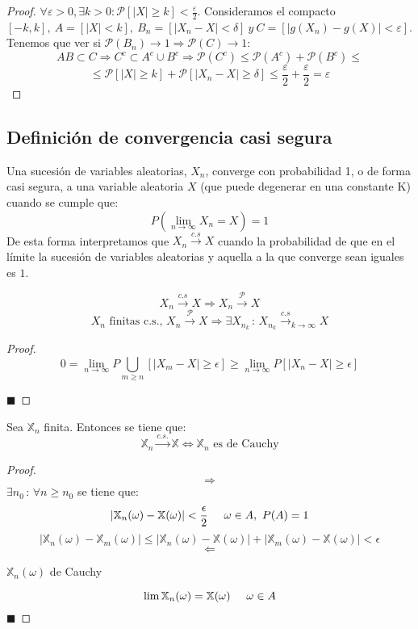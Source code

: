 \documentclass[12pt,a4paper]{book}
\newcommand*{\qed}{\hfill\ensuremath{\blacksquare}}
\begin{document}
\begin{proof}
$\forall \varepsilon > 0, \exists k>0 : \mathcal{P}[|X| \geq k] < \frac{\varepsilon}{2}$. Consideramos el compacto $[-k,k], \ A = [|X| < k], \ B_n = [|X_n - X| < \delta] \ y \ C = [|g(X_n) - g(X)| < \varepsilon]$. Tenemos que ver si $\mathcal{P}(B_n)\to 1 \Rightarrow \mathcal{P}(C)\to 1 $:
$$ AB \subset C \Rightarrow C^c \subset A^c \cup B^c \Rightarrow \mathcal{P}(C^c) \leq \mathcal{P}(A^c) + \mathcal{P}(B^c) \leq $$
$$ \leq \mathcal{P}[|X| \geq k] + \mathcal{P}[|X_n - X| \geq \delta] \leq \frac{\varepsilon}{2} + \frac{\varepsilon}{2} = \varepsilon$$
\end{proof}

\subsection{Definición de convergencia casi segura}

Una sucesión de variables aleatorias, ${ X_n }$, converge con probabilidad 1, o de forma casi segura, a una variable aleatoria $X$ (que puede degenerar en una constante K) cuando se cumple que:
$$P(\lim_{n\rightarrow\infty}X_n=X)=1$$
De esta forma interpretamos que $X_n\stackrel{c.s}{\longrightarrow}X$ cuando la probabilidad de que en el límite la sucesión de variables  aleatorias y aquella a la que converge sean iguales es $1$.

\begin{theorem}
$$X_n\stackrel{c.s}{\longrightarrow}X\Longrightarrow X_n\stackrel{\mathcal{P}}{\longrightarrow}X$$
$$X_n \text{ finitas c.s.,  }
X_n\stackrel{\mathcal{P}}{\longrightarrow}X
\Longrightarrow 
\exists X_{n_k}\,:\, X_{n_k}
\stackrel{c.s}{\longrightarrow}_{k\rightarrow\infty}X$$
\end{theorem}
\begin{proof}
$$0=\displaystyle\lim_{n\rightarrow\infty}P\bigcup_{m\geq n}[|X_m - X|\geq \epsilon ]\geq\displaystyle\lim_{n\rightarrow\infty}P[|X_n - X|\geq \epsilon ]$$

\qed
\end{proof}

\begin{lemma}
Sea $\mathbb{X}_n$ finita. Entonces se tiene que:
\\
$$\mathbb{X}_n \stackrel{c.s.}{\longrightarrow}\mathbb{X}\Longleftrightarrow \mathbb{X}_n \text{ es de Cauchy}$$
\end{lemma}
\begin{proof}
$$\Longrightarrow$$
$\exists n_0\, : \, \forall n\geq n_0$ se tiene que:
$$|\mathbb{X}_n(\omega)-\mathbb{X}(\omega)|<\frac{\epsilon}{2}
\hspace{0.5cm}  \omega \in A,\ P(A)=1$$
$$|\mathbb{X}_n(\omega)-\mathbb{X}_m(\omega)|\leq|\mathbb{X}_n(\omega)-\mathbb{X}(\omega)|+|\mathbb{X}_m(\omega)-\mathbb{X}(\omega)|<\epsilon$$
$$\Longleftarrow$$
\begin{center}
${\mathbb{X}_n(\omega)}$ de Cauchy
\end{center}
$$\lim\mathbb{X}_n(\omega)=\mathbb{X}(\omega)\hspace{0.5cm} \omega \in A$$
\qed
\end{proof}
\end{document}
